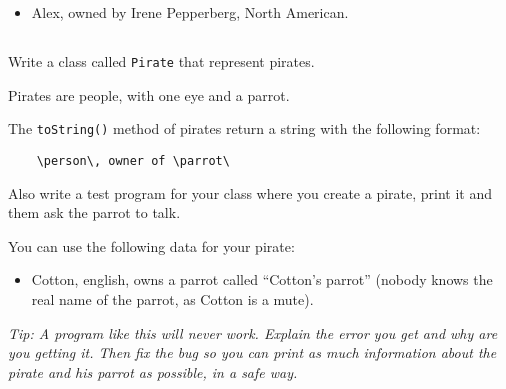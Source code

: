 \documentclass[a4paper, 11pt]{article}
\begin{document}
\begin{itemize}

  \item Alex, owned by Irene Pepperberg, North American.

\end{itemize}










\subsection{}

Write a class called \verb+Pirate+ that represent pirates.

Pirates are people, with one eye and a parrot.

The \verb+toString()+ method of pirates return a string with the following
format:

\verb+    \person\, owner of \parrot\+

Also write a test program for your class where you create a pirate, print it
and them ask the parrot to talk.

You can use the following data for your pirate:

\begin{itemize}

  \item Cotton, english, owns a parrot called ``Cotton's parrot'' (nobody knows
    the real name of the parrot, as Cotton is a mute).

\end{itemize}

\textsl{Tip: A program like this will never work. Explain the error you get and
why are you getting it.  Then fix the bug so you can print as much information
about the pirate and his parrot as possible, in a safe way.}

\end{document}
